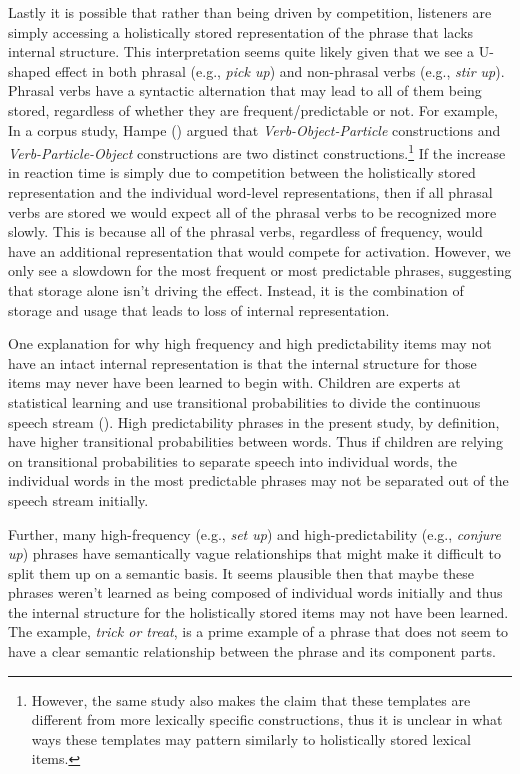 \documentclass[
  12pt,
  letterpaper,
]{scrreprt}
\begin{document}
Lastly it is possible that rather than being driven by competition,
listeners are simply accessing a holistically stored representation of
the phrase that lacks internal structure. This interpretation seems
quite likely given that we see a U-shaped effect in both phrasal (e.g.,
\emph{pick up}) and non-phrasal verbs (e.g., \emph{stir up}). Phrasal
verbs have a syntactic alternation that may lead to all of them being
stored, regardless of whether they are frequent/predictable or not. For
example, In a corpus study, Hampe
() argued that
\emph{Verb-Object-Particle} constructions and
\emph{Verb-Particle-Object} constructions are two distinct
constructions.\footnote{However, the same study also makes the claim
  that these templates are different from more lexically specific
  constructions, thus it is unclear in what ways these templates may
  pattern similarly to holistically stored lexical items.} If the
increase in reaction time is simply due to competition between the
holistically stored representation and the individual word-level
representations, then if all phrasal verbs are stored we would expect
all of the phrasal verbs to be recognized more slowly. This is because
all of the phrasal verbs, regardless of frequency, would have an
additional representation that would compete for activation. However, we
only see a slowdown for the most frequent or most predictable phrases,
suggesting that storage alone isn't driving the effect. Instead, it is
the combination of storage and usage that leads to loss of internal
representation.

One explanation for why high frequency and high predictability items may
not have an intact internal representation is that the internal
structure for those items may never have been learned to begin with.
Children are experts at statistical learning and use transitional
probabilities to divide the continuous speech stream
(). High predictability phrases in the present study, by definition,
have higher transitional probabilities between words. Thus if children
are relying on transitional probabilities to separate speech into
individual words, the individual words in the most predictable phrases
may not be separated out of the speech stream initially.

Further, many high-frequency (e.g., \emph{set up}) and
high-predictability (e.g., \emph{conjure up}) phrases have semantically
vague relationships that might make it difficult to split them up on a
semantic basis. It seems plausible then that maybe these phrases weren't
learned as being composed of individual words initially and thus the
internal structure for the holistically stored items may not have been
learned. The example, \emph{trick or treat}, is a prime example of a
phrase that does not seem to have a clear semantic relationship between
the phrase and its component parts.
\end{document}
